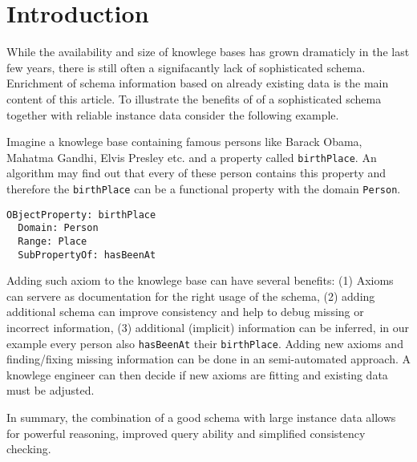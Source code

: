 \section{Introduction}

While the availability and size of knowlege bases has grown dramaticly in the
last few years, there is still often a signifacantly lack of sophisticated
schema.
Enrichment of schema information based on already existing data is the main
content of this article.
To illustrate the benefits of of a sophisticated schema together with reliable
instance data consider the following example.

\begin{example}
Imagine a knowlege base containing famous persons like Barack Obama, Mahatma
Gandhi, Elvis Presley etc. and a property called \texttt{birthPlace}. An
algorithm may find out that every of these person contains this property and
therefore the \texttt{birthPlace} can be a functional property with the domain
\texttt{Person}.
\vspace{-0.55 cm}
\begin{verbatim}
OBjectProperty: birthPlace
  Domain: Person
  Range: Place
  SubPropertyOf: hasBeenAt
\end{verbatim}
\end{example}
\vspace{-0.4 cm}

Adding such axiom to the knowlege base can have several benefits\cite{paper2}:
(1) Axioms can servere as documentation for the right usage of the schema, (2) adding
additional schema can improve consistency and help to debug missing or incorrect
information, (3) additional (implicit) information can be inferred, in our
example every person also \texttt{hasBeenAt} their \texttt{birthPlace}.
Adding new axioms and finding/fixing missing information can be done in an
semi-automated approach. A knowlege engineer can then decide if new axioms are
fitting and existing data must be adjusted.

In summary, the combination of a good schema with large instance data allows for
powerful reasoning, improved query ability and simplified consistency checking. 